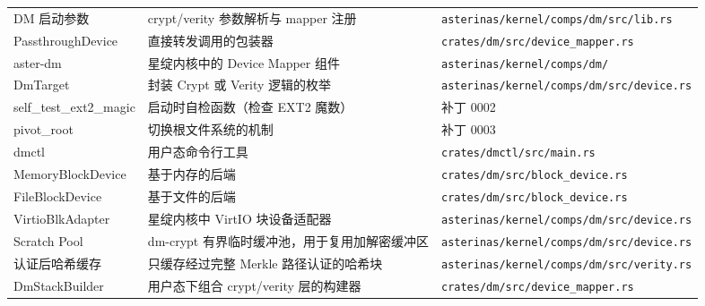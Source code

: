 \begin{longtable}{|p{}|p{}|p{}|}
DM 启动参数 & crypt/verity 参数解析与 mapper 注册 & \texttt{asterinas/\allowbreak kernel/\allowbreak comps/\allowbreak dm/\allowbreak src/\allowbreak lib.rs} \\
Passthrough\allowbreak Device & 直接转发调用的包装器 & \texttt{crates/\allowbreak dm/\allowbreak src/\allowbreak device\_\allowbreak mapper.rs} \\
aster-dm & 星绽内核中的 Device Mapper 组件 & \texttt{asterinas/\allowbreak kernel/\allowbreak comps/\allowbreak dm/} \\
DmTarget & 封装 Crypt 或 Verity 逻辑的枚举 & \texttt{asterinas/\allowbreak kernel/\allowbreak comps/\allowbreak dm/\allowbreak src/\allowbreak device.rs} \\
self\_\allowbreak test\_\allowbreak ext2\_\allowbreak magic & 启动时自检函数（检查 EXT2 魔数） & 补丁 0002 \\
pivot\_\allowbreak root & 切换根文件系统的机制 & 补丁 0003 \\
dmctl & 用户态命令行工具 & \texttt{crates/\allowbreak dmctl/\allowbreak src/\allowbreak main.rs} \\
Memory\allowbreak Block\allowbreak Device & 基于内存的后端 & \texttt{crates/\allowbreak dm/\allowbreak src/\allowbreak block\_\allowbreak device.rs} \\
File\allowbreak Block\allowbreak Device & 基于文件的后端 & \texttt{crates/\allowbreak dm/\allowbreak src/\allowbreak block\_\allowbreak device.rs} \\
Virtio\allowbreak Blk\allowbreak Adapter & 星绽内核中 VirtIO 块设备适配器 & \texttt{asterinas/\allowbreak kernel/\allowbreak comps/\allowbreak dm/\allowbreak src/\allowbreak device.rs} \\
Scratch Pool & dm-crypt 有界临时缓冲池，用于复用加解密缓冲区 & \texttt{asterinas/\allowbreak kernel/\allowbreak comps/\allowbreak dm/\allowbreak src/\allowbreak device.rs} \\
认证后哈希缓存 & 只缓存经过完整 Merkle 路径认证的哈希块 & \texttt{asterinas/\allowbreak kernel/\allowbreak comps/\allowbreak dm/\allowbreak src/\allowbreak verity.rs} \\
DmStack\allowbreak Builder & 用户态下组合 crypt/verity 层的构建器 & \texttt{crates/\allowbreak dm/\allowbreak src/\allowbreak device\_\allowbreak mapper.rs} \\
\hline
\end{longtable}